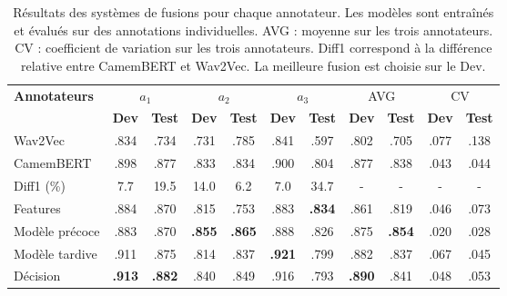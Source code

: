 \begin{table}[h]
    \centering
    \begin{tabular}{| l |cc| cc | cc | cc | cc |}\hline
     \textbf{Annotateurs} & \multicolumn{2}{c|}{$a_1$} & \multicolumn{2}{c|}{$a_2$}  &\multicolumn{2}{c|}{$a_3$} &\multicolumn{2}{c|}{AVG} & \multicolumn{2}{c|}{CV}\\
      & \textbf{Dev} &\textbf{Test} &\textbf{Dev}  &\textbf{Test} & \textbf{Dev} &\textbf{Test} & \textbf{Dev} &\textbf{Test} & \textbf{Dev} &\textbf{Test}\\ \hline

     Wav2Vec    & .834 & .734 & .731 & .785 & .841 & .597 & .802 & .705 & .077 & .138\\
     CamemBERT  & .898 & .877 & .833 & .834 & .900 & .804 & .877 & .838 & .043 & .044\\
     Diff1 (\%)           & 7.7 & 19.5 & 14.0 & 6.2 & 7.0 & 34.7 & - & - & - & -\\
     \hline
     Features              & .884 & .870 & .815 & .753 & .883 & \textbf{.834} & .861 & .819 & .046 & .073 \\
     \hline
     Modèle précoce    & .883 & .870 & \textbf{.855} & \textbf{.865} & .888 & .826 & .875 & \textbf{.854} & .020 & .028\\
     Modèle tardive     & .911 & .875 & .814 & .837 & \textbf{.921} & .799 & .882 & .837 & .067 & .045\\
     \hline
     Décision           & \textbf{.913} & \textbf{.882} & .840 & .849 & .916 & .793 & \textbf{.890} & .841 & .048 & .053 \\
     \hline

    \end{tabular}
    \caption{Résultats des systèmes de fusions pour chaque annotateur. Les modèles sont entraînés et évalués sur des annotations individuelles. AVG : moyenne sur les trois annotateurs. CV : coefficient de variation sur les trois annotateurs. Diff1 correspond à la différence relative entre CamemBERT et Wav2Vec. La meilleure fusion est choisie sur le Dev.}
    \label{tab:ind_by_annotator}
\end{table}
